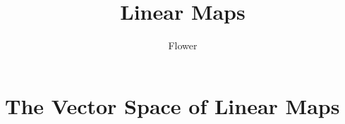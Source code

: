 \documentclass[
	12pt, %
]{fphw}
\title{Linear Maps} %
\author{Flower} %
\date{} %
\institute{University of Mars \\ Institute of Intergalactic Travel} %
\begin{document}
\maketitle %


\section{The Vector Space of Linear Maps}






\end{document}
